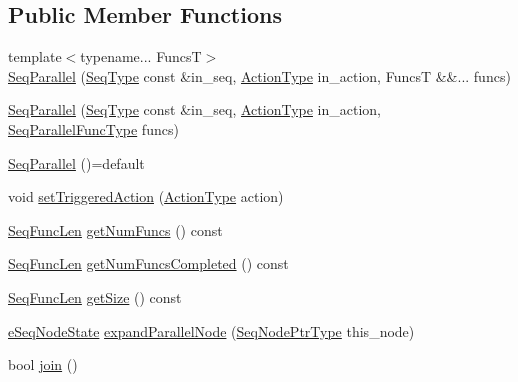 \subsection*{Public Member Functions}
\begin{DoxyCompactItemize}
\item 
{\footnotesize template$<$typename... FuncsT$>$ }\\\hyperlink{structvt_1_1seq_1_1_seq_parallel_a2b79a4c7f0ddc27499ad263bfd57c7da}{Seq\+Parallel} (\hyperlink{namespacevt_1_1seq_a3b612da217ac669d39c159f134ab8434}{Seq\+Type} const \&in\+\_\+seq, \hyperlink{namespacevt_ae0a5a7b18cc99d7b732cb4d44f46b0f3}{Action\+Type} in\+\_\+action, FuncsT \&\&... funcs)
\item 
\hyperlink{structvt_1_1seq_1_1_seq_parallel_a1ba47a7c08c48604178a7aac55ddc9c1}{Seq\+Parallel} (\hyperlink{namespacevt_1_1seq_a3b612da217ac669d39c159f134ab8434}{Seq\+Type} const \&in\+\_\+seq, \hyperlink{namespacevt_ae0a5a7b18cc99d7b732cb4d44f46b0f3}{Action\+Type} in\+\_\+action, \hyperlink{structvt_1_1seq_1_1_seq_parallel_a5804979becb9986676dcba10487eb8de}{Seq\+Parallel\+Func\+Type} funcs)
\item 
\hyperlink{structvt_1_1seq_1_1_seq_parallel_adaec7d806b4bc01e612fc1666a4c9107}{Seq\+Parallel} ()=default
\item 
void \hyperlink{structvt_1_1seq_1_1_seq_parallel_a19b3844758dcb47670d7fa428f6c7b7c}{set\+Triggered\+Action} (\hyperlink{namespacevt_ae0a5a7b18cc99d7b732cb4d44f46b0f3}{Action\+Type} action)
\item 
\hyperlink{structvt_1_1seq_1_1_seq_parallel_ab6a1d3fc6dbc5210e559c96f57f64e79}{Seq\+Func\+Len} \hyperlink{structvt_1_1seq_1_1_seq_parallel_af826493cdf253e4782563bf9757f273d}{get\+Num\+Funcs} () const
\item 
\hyperlink{structvt_1_1seq_1_1_seq_parallel_ab6a1d3fc6dbc5210e559c96f57f64e79}{Seq\+Func\+Len} \hyperlink{structvt_1_1seq_1_1_seq_parallel_a051904f27dbddab87b202c9bb86aa163}{get\+Num\+Funcs\+Completed} () const
\item 
\hyperlink{structvt_1_1seq_1_1_seq_parallel_ab6a1d3fc6dbc5210e559c96f57f64e79}{Seq\+Func\+Len} \hyperlink{structvt_1_1seq_1_1_seq_parallel_aa8fb8295fd13135a7bd989f570fe8cb9}{get\+Size} () const
\item 
\hyperlink{namespacevt_1_1seq_ad7b0496818667d816e00f717491d3b92}{e\+Seq\+Node\+State} \hyperlink{structvt_1_1seq_1_1_seq_parallel_a76d99828f1f5ff95f3ab25765a2453c3}{expand\+Parallel\+Node} (\hyperlink{namespacevt_1_1seq_ae6a4874b585be0612aaca32ca6d2d191}{Seq\+Node\+Ptr\+Type} this\+\_\+node)
\item 
bool \hyperlink{structvt_1_1seq_1_1_seq_parallel_a57f8521e9444d248d46957cc3677db08}{join} ()
\end{DoxyCompactItemize}
